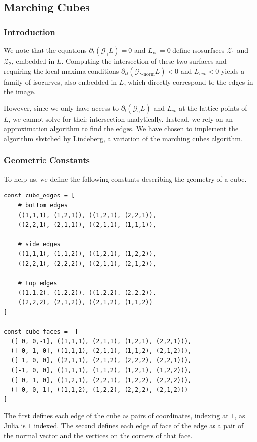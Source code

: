 \documentclass{article}
\begin{document}
\subsection{Marching Cubes}
\label{mcube}
\subsubsection{Introduction}
We note that the equations $\partial_t (\mathcal G_{\gamma} L) =0 $ and $L_{vv} = 0$ define isosurfaces $\mathcal Z_1$ and $\mathcal Z_2$, embedded in $L$.
Computing the intersection of these two surfaces and requiring the local maxima conditions $\partial_{tt} (\mathcal G_{\text{$\gamma$-norm}} L) < 0$ and $L_{vvv} < 0$ yields a family of isocurves, also embedded in $L$, which directly correspond to the edges in the image.

However, since we only have access to $\partial_t (\mathcal G_\gamma L)$ and $L_{vv}$ at the lattice points of $L$, we cannot solve for their intersection analytically.
Instead, we rely on an approximation algorithm to find the edges.
We have chosen to implement the algorithm sketched by Lindeberg, a variation of the marching cubes algorithm.

\subsubsection{Geometric Constants}
To help us, we define the following constants describing the geometry of a cube.
\begin{lstlisting}
const cube_edges = [
    # bottom edges
    ((1,1,1), (1,2,1)), ((1,2,1), (2,2,1)),
    ((2,2,1), (2,1,1)), ((2,1,1), (1,1,1)),

    # side edges
    ((1,1,1), (1,1,2)), ((1,2,1), (1,2,2)),
    ((2,2,1), (2,2,2)), ((2,1,1), (2,1,2)),

    # top edges
    ((1,1,2), (1,2,2)), ((1,2,2), (2,2,2)),
    ((2,2,2), (2,1,2)), ((2,1,2), (1,1,2))
]

const cube_faces =  [
  ([ 0, 0,-1], ((1,1,1), (2,1,1), (1,2,1), (2,2,1))),
  ([ 0,-1, 0], ((1,1,1), (2,1,1), (1,1,2), (2,1,2))),
  ([ 1, 0, 0], ((2,1,1), (2,1,2), (2,2,2), (2,2,1))),
  ([-1, 0, 0], ((1,1,1), (1,1,2), (1,2,1), (1,2,2))),
  ([ 0, 1, 0], ((1,2,1), (2,2,1), (1,2,2), (2,2,2))),
  ([ 0, 0, 1], ((1,1,2), (1,2,2), (2,2,2), (2,1,2)))
]
\end{lstlisting}
The first defines each edge of the cube as pairs of coordinates, indexing at $1$, as Julia is $1$ indexed.
The second defines each edge of face of the edge as a pair of the normal vector and the vertices on the corners of that face.
\end{document}
